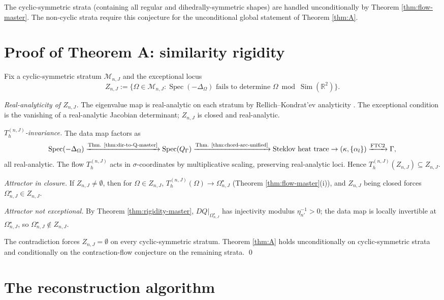 \documentclass[11pt,reqno]{amsart}
\theoremstyle{plain}
\theoremstyle{definition}
\theoremstyle{remark}
\DeclareMathOperator{\Spec}{Spec}
\DeclareMathOperator{\Sim}{Sim}
\newcommand{\Reals}{\mathbb{R}}
\newcommand{\Mcal}{\mathcal{M}}
\newcommand{\Qop}{Q}
\begin{document}
The cyclic-symmetric strata (containing all regular and dihedrally-symmetric shapes) are handled unconditionally by Theorem \ref{thm:flow-master}. The non-cyclic strata require this conjecture for the unconditional global statement of Theorem \ref{thm:A}.

\section{Proof of Theorem A: similarity rigidity}\label{sec:proof-A}

Fix a cyclic-symmetric stratum $\Mcal_{n,J}$ and the exceptional locus
\[
Z_{n,J} := \{\Omega \in \Mcal_{n,J} : \Spec(-\Delta_\Omega) \text{ fails to determine } \Omega \bmod \Sim(\Reals^2)\}.
\]

\emph{Real-analyticity of $Z_{n,J}$.} The eigenvalue map is real-analytic on each stratum by Rellich--Kondrat'ev analyticity \cite{Kondratev}. The exceptional condition is the vanishing of a real-analytic Jacobian determinant; $Z_{n,J}$ is closed and real-analytic.

\emph{$T_h^{(n,J)}$-invariance.} The data map factors as
\[
\Spec(-\Delta_\Omega) \xrightarrow{\text{Thm. \ref{thm:dir-to-Q-master}}} \Spec(\Qop_\Gamma) \xrightarrow{\text{Thm. \ref{thm:chord-arc-unified}}} \text{Steklov heat trace} \to (\kappa, \{\alpha_l\}) \xrightarrow{\text{FTC2}} \Gamma,
\]
all real-analytic. The flow $T_h^{(n,J)}$ acts in $\sigma$-coordinates by multiplicative scaling, preserving real-analytic loci. Hence $T_h^{(n,J)}(Z_{n,J}) \subseteq Z_{n,J}$.

\emph{Attractor in closure.} If $Z_{n,J} \neq \emptyset$, then for $\Omega \in Z_{n,J}$, $T_h^{(n,J)}(\Omega) \to \Omega^\star_{n,J}$ (Theorem \ref{thm:flow-master}(i)), and $Z_{n,J}$ being closed forces $\Omega^\star_{n,J} \in Z_{n,J}$.

\emph{Attractor not exceptional.} By Theorem \ref{thm:rigidity-master}, $D\Qop|_{\Omega^\star_{n,J}}$ has injectivity modulus $\eta_{n'}^{-1} > 0$; the data map is locally invertible at $\Omega^\star_{n,J}$, so $\Omega^\star_{n,J} \notin Z_{n,J}$.

The contradiction forces $Z_{n,J} = \emptyset$ on every cyclic-symmetric stratum. Theorem \ref{thm:A} holds unconditionally on cyclic-symmetric strata and conditionally on the contraction-flow conjecture on the remaining strata.
\qed

\section{The reconstruction algorithm}\label{sec:reconstruction-algorithm}
\end{document}
